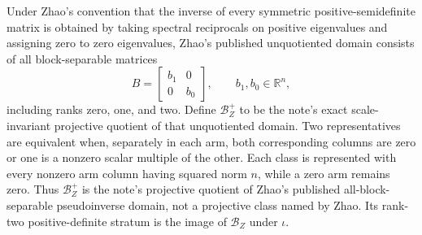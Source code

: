 Under Zhao's convention that the inverse of every symmetric positive-semidefinite matrix is obtained by taking spectral reciprocals on positive eigenvalues and assigning zero to zero eigenvalues, Zhao's published unquotiented domain consists of all block-separable matrices
\[
B=\begin{bmatrix}b_1&0\\0&b_0\end{bmatrix},\qquad b_1,b_0\in\mathbb R^n,
\]
including ranks zero, one, and two.  Define \(\mathcal B_Z^+\) to be the note's exact scale-invariant projective quotient of that unquotiented domain.  Two representatives are equivalent when, separately in each arm, both corresponding columns are zero or one is a nonzero scalar multiple of the other.  Each class is represented with every nonzero arm column having squared norm \(n\), while a zero arm remains zero.  Thus \(\mathcal B_Z^+\) is the note's projective quotient of Zhao's published all-block-separable pseudoinverse domain, not a projective class named by Zhao.  Its rank-two positive-definite stratum is the image of \(\mathcal B_Z\) under \(\iota\).